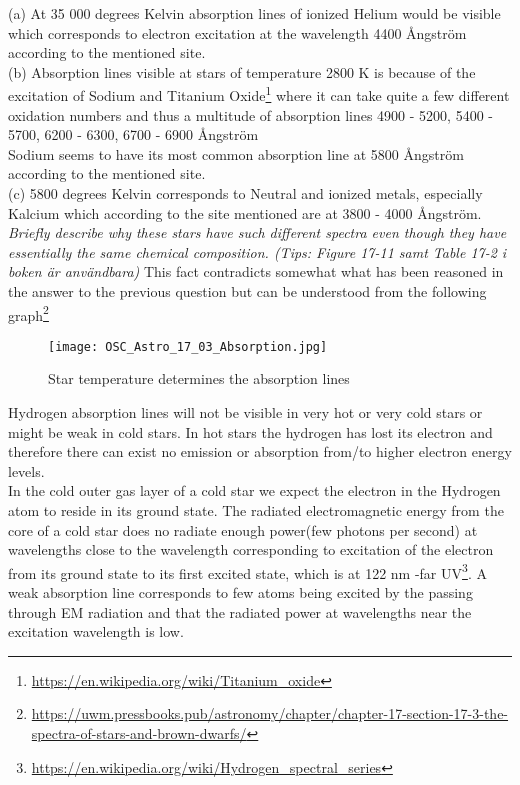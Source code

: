 \documentclass[./exercises.tex]{subfiles}
\begin{document}
\begin{enumerate}
(a) At 35 000 degrees Kelvin absorption lines of ionized Helium
would be visible which corresponds to electron excitation
at the wavelength 4400 Ångström according to the mentioned site.\\

(b) Absorption lines visible at stars of temperature 2800 K is
because of the excitation of Sodium and Titanium Oxide\footnote{\url{https://en.wikipedia.org/wiki/Titanium_oxide}}
where it can take quite a few different oxidation numbers and thus a multitude
of absorption lines 4900 - 5200, 5400 - 5700, 6200 - 6300, 6700 - 6900 Ångström\\
Sodium seems to have its most common absorption line at 5800 Ångström according to the mentioned
site.\\

(c) 5800 degrees Kelvin corresponds to Neutral and ionized metals, especially Kalcium
which according to the site mentioned are at 3800 - 4000 Ångström.\\



\textit{Briefly describe why these stars have such different spectra even though they have 
essentially the same chemical composition.  
(Tips: Figure 17-11 samt Table 17-2 i boken är användbara)}
This fact contradicts somewhat what has been reasoned in the answer to the previous question
but can be understood from the following graph\footnote{\url{https://uwm.pressbooks.pub/astronomy/chapter/chapter-17-section-17-3-the-spectra-of-stars-and-brown-dwarfs/}}
\begin{figure}[H]
  \texttt{[image: OSC\_Astro\_17\_03\_Absorption.jpg]}
  \caption{Star temperature determines the absorption lines}
  \label{fig:fig1}
\end{figure}
Hydrogen absorption lines will not be visible in very hot or very cold stars
or might be weak in cold stars.
In hot stars the hydrogen has lost its electron and therefore there can exist
no emission or absorption from/to higher electron energy levels.\\

In the cold outer gas layer of a cold star we expect the electron in the Hydrogen atom 
to reside in its ground state. The radiated electromagnetic energy from the core of a cold star
does no radiate enough power(few photons per second) at wavelengths close to the wavelength
corresponding to excitation of the electron from its ground state to its first excited state, which
is at 122 nm -far UV\footnote{\url{https://en.wikipedia.org/wiki/Hydrogen_spectral_series}}.
A weak absorption line corresponds to few atoms being excited by the passing through EM radiation and
that the radiated power at wavelengths near the excitation wavelength is low.


\end{enumerate}
\end{document}
